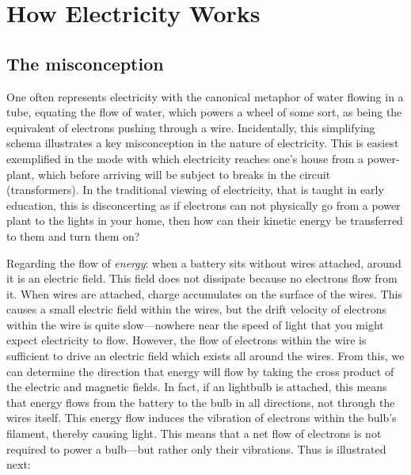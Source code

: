 \documentclass[12pt]{report}
\begin{document}
\section{How Electricity Works} 
\subsection{The misconception} One often represents electricity with the canonical metaphor of water flowing in a tube, equating the flow of water, which powers a wheel of some sort, as being the equivalent of electrons pushing through a wire. Incidentally, this simplifying schema illustrates a key misconception in the nature of electricity. This is easiest exemplified in the mode with which electricity reaches one's house from a power-plant, which before arriving will be subject to breaks in the circuit (transformers). In the traditional viewing of electricity, that is taught in early education, this is disconcerting as if electrons can not physically go from a power plant to the lights in your home, then how can their kinetic energy be transferred to them and turn them on?\newline

Regarding the flow of \textit{energy}: when a battery sits without wires attached, around it is an electric field. This field does not dissipate because no electrons flow from it. When wires are attached, charge accumulates on the surface of the wires. This causes a small electric field within the wires, but the drift velocity of electrons within the wire is quite slow---nowhere near the speed of light that you might expect electricity to flow. However, the flow of electrons within the wire is sufficient to drive an electric field which exists all around the wires. From this, we can determine the direction that energy will flow by taking the cross product of the electric and magnetic fields. In fact, if an lightbulb is attached, this means that energy flows from the battery to the bulb in all directions, not through the wires itself. This energy flow induces the vibration of electrons within the bulb's filament, thereby causing light. This means that a net flow of electrons is not required to power a bulb---but rather only their vibrations. Thus is illustrated next:\newline 
\end{document}
